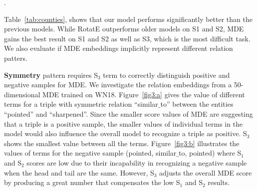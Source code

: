 \documentclass{ecai}
\begin{document}
\begin{table}\centering
{}
    \caption{Results on the Countries datasets. Results of RotatE are taken from~\cite{sun2019rotate} and the results of the other models are from~\cite{dettmers2018convolutional}.}.
\label{tab:counties}
\end{table}

Table~\ref{tab:counties}, shows that our model performs significantly better than the previous models. While RotatE outperforms older models on S1 and S2, MDE gains the best result on S1 and S2 as well as S3, which is the most difficult task.
We also evaluate if MDE embeddings implicitly represent different relation patters.

\textbf{Symmetry} pattern requires S$_3$ term to correctly distinguish positive and negative samples for MDE. We investigate the relation embeddings from a 50-dimensional MDE trained on WN18. Figure~\ref{fig3:a} gives the value of different terms for a triple with symmetric relation ``similar$\_$to'' between the entities ``pointed'' and ``sharpened''. Since the smaller score values of MDE are suggesting that a triple is a positive sample, the smaller values of individual terms in the model would also influence the overall model to recognize a triple as positive. S$_3$ shows the smallest value between all the terms.
Figure~\ref{fig3:b} illustrates the values of terms for the negative sample (pointed, similar$\_$to, pointed) where S$_1$ and S$_2$ scores are low due to their incapability in recognizing a negative sample when the head and tail are the same. However, S$_3$ adjusts the overall MDE score by producing a great number that compensates the low S$_1$ and S$_2$ results.
\end{document}
